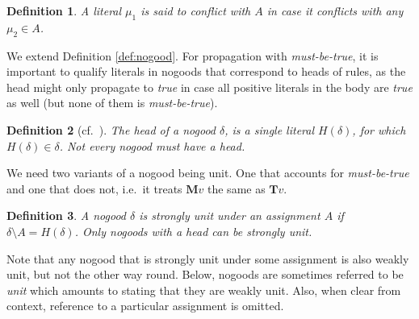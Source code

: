 \documentclass[final]{vutinfth} %
\newcommand{\todo}[1]{{\color{red}\textbf{TODO: {#1}}}} %
\newtheorem{definition}{Definition}[chapter]
\newcommand{\mbt}{must-be-true\xspace}
\newcommand{\ass}{A}
\newcommand{\bT}{\mathbf{T}}
\newcommand{\bM}{\mathbf{M}}
\newcommand{\bF}{\mathbf{F}}
\newcommand{\bX}{\mathbf{X}}
\newcommand{\headf}{H}
\newcommand{\bodyf}{B}
\newcommand{\sgl}{\mu}
\begin{document}


\begin{definition}
A literal $\sgl_1$ is said to conflict with $\ass$ in case it conflicts with any $\sgl_2 \in \ass$.
\end{definition}

We extend Definition \ref{def:nogood}. For propagation with \emph{\mbt}, it is important to qualify literals in nogoods that correspond to heads of rules, as the head might only propagate to \emph{true} in case all positive literals in the body are \emph{true} as well (but none of them is \emph{\mbt}). %

\begin{definition}[{cf.~\cite{alpha-techniques}}]
The \emph{head} of a nogood $\delta$, is a single literal $\headf(\delta)$, for which $\headf(\delta) \in \delta$. Not every nogood must have a head.%
\end{definition}



We need two variants of a nogood being unit. One that accounts for \emph{\mbt} and one that does not, i.e.~it treats $\bM v$ the same as $\bT v$.

\begin{definition}
A nogood $\delta$ is \emph{strongly unit} under an assignment $\ass$ if $\delta \setminus \ass = \headf(\delta)$. Only nogoods with a head can be strongly unit.
\end{definition}

Note that any nogood that is strongly unit under some assignment is also weakly unit, but not the other way round. Below, nogoods are sometimes referred to be \emph{unit} which amounts to stating that they are weakly unit. Also, when clear from context, reference to a particular assignment is omitted.
\end{document}
